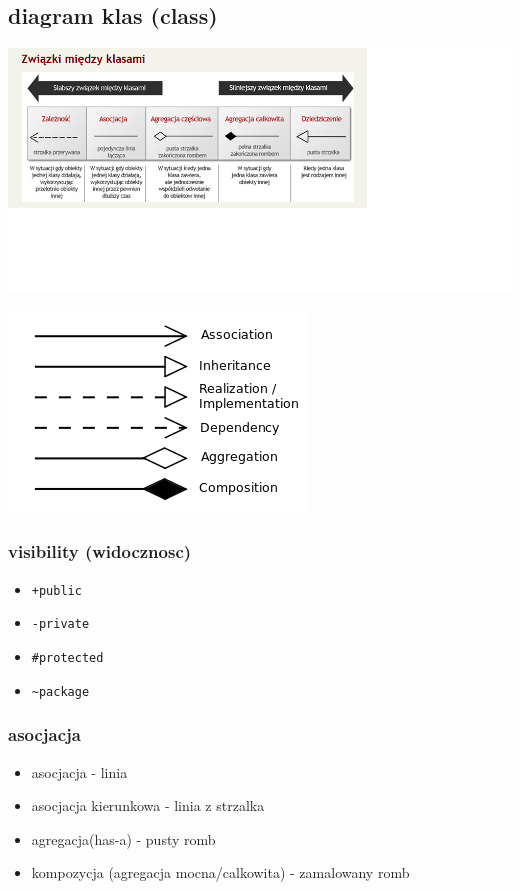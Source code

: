 \documentclass[11pt]{article}
\begin{document}
\subsection{diagram klas (class)}
\label{sec:org1cf61a1}
\begin{center}
\includegraphics[width=.9\linewidth]{./zwiazki_UML.png}
\end{center}
\begin{center}
\includegraphics[width=.9\linewidth]{./uml.png}
\end{center}
\subsubsection{visibility (widocznosc)}
\label{sec:org9c48194}
\begin{itemize}
\item \texttt{+public}
\item \texttt{-private}
\item \texttt{\#protected}
\item \texttt{\textasciitilde{}package}
\end{itemize}
\subsubsection{asocjacja}
\label{sec:org955c808}
\begin{itemize}
\item asocjacja - linia
\item asocjacja kierunkowa - linia z strzalka
\item agregacja(has-a) - pusty romb
\item kompozycja (agregacja mocna/calkowita) - zamalowany romb
\end{itemize}
\end{document}
